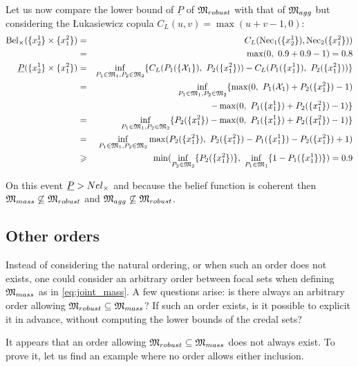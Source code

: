 \begin{example}
    Let us now compare the lower bound of $\underline{P}$ of ${\mathfrak{M}}_{robust}$ with that of ${\mathfrak{M}}_{agg}$ but considering the \L ukasiewicz copula $C_L(u,v)=\max(u+v-1,0)$:
    \begin{eqnarray*}
        \mathrm{Bel}_\times(\{x^1_2\}\times\{x^2_1\}) &=& C_L(\mathrm{Nec}_1(\{x^1_2\}), \mathrm{Nec}_2(\{x^2_1\}))\\
        &=& \max(0,~0.9 + 0.9 - 1) = 0.8\\
        {\underline{P}}(\{x^1_2\}\times\{x^2_1\}) &=& \inf_{P_1\in{\mathfrak{M}}_1, P_2\in{\mathfrak{M}}_2}\{C_L(P_1(\{{\mathcal{X}}_1\}),~P_2(\{x^2_1\})) - C_L(P_1(\{x^1_1\}),~P_2(\{x^2_1\}))\}\\
        &=& \inf_{P_1\in{\mathfrak{M}}_1, P_2\in{\mathfrak{M}}_2}\{\max(0,~P_1({\mathcal{X}}_1) + P_2(\{x^2_1\}) - 1)\\
        && - \max(0,~P_1(\{x^1_1\}) + P_2(\{x^2_1\}) -1)\}\\
        &=& \inf_{P_1\in{\mathfrak{M}}_1, P_2\in{\mathfrak{M}}_2}\{P_2(\{x^2_1\}) - \max(0,~P_1(\{x^1_1\}) + P_2(\{x^2_1\}) - 1 )\}\\
        &=& \inf_{P_1\in{\mathfrak{M}}_1, P_2\in{\mathfrak{M}}_2}\max(P_2(\{x^2_1\}),~P_2(\{x^2_1\})-P_1(\{x^1_1\}) - P_2(\{x^2_1\}) + 1 )\\
        &\geqslant& \min(\inf_{P_2\in{\mathfrak{M}}_2}\{P_2(\{x^2_1\})\},~\inf_{P_1\in{\mathfrak{M}}_1}\{1-P_1(\{x^1_1\})\}) = 0.9
    \end{eqnarray*}
    
    On this event ${\underline{P}}>Nel_\times$ and because the belief function is coherent then ${\mathfrak{M}}_{mass}\not\subseteq{\mathfrak{M}}_{robust}$ and ${\mathfrak{M}}_{agg}\not\subseteq{\mathfrak{M}}_{robust}$.
\end{example}


\subsection{Other orders}
Instead of considering the natural ordering, or when such an order does not exists, one could consider an arbitrary order between focal sets when defining ${\mathfrak{M}}_{mass}$ as in \ref{eq:joint_mass}. A few questions arise: is there always an arbitrary order allowing ${\mathfrak{M}}_{robust}\subseteq{\mathfrak{M}}_{mass}$? If such an order exists, is it possible to explicit it in advance, \ie without computing the lower bounds of the credal sets?

It appears that an order allowing ${\mathfrak{M}}_{robust}\subseteq{\mathfrak{M}}_{mass}$ does not always exist. To prove it, let us find an example where no order allows either inclusion.

